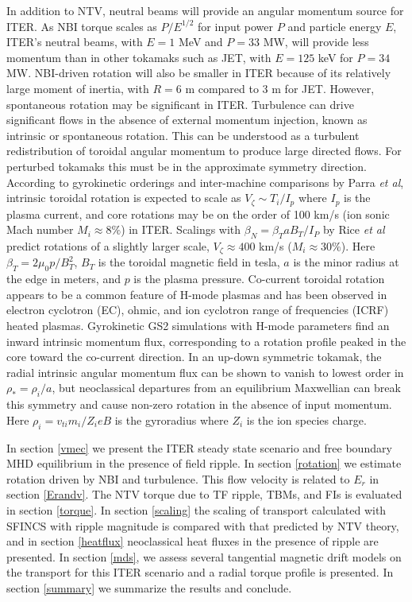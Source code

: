 \documentclass[aip, pop, preprint]{revtex4-1}
\numberwithin{figure}{section}
\numberwithin{equation}{section}
\begin{document}
In addition to NTV, neutral beams will provide an angular momentum source for ITER. As NBI torque scales as $P/E^{1/2}$ for input power $P$ and particle energy $E$, ITER's neutral beams, with $E = 1$ MeV and $P = 33$ MW, will provide less momentum than in other tokamaks such as JET, with $E = 125$ keV for $P = 34$ MW.\cite{Ciric2011} NBI-driven rotation will also be smaller in ITER because of its relatively large moment of inertia, with $R = 6$ m compared to 3 m for JET. However, spontaneous rotation may be significant in ITER. Turbulence can drive significant flows in the absence of external momentum injection, known as intrinsic or spontaneous rotation. This can be understood as a turbulent redistribution of toroidal angular momentum to produce large directed flows. For perturbed tokamaks this must be in the approximate symmetry direction. According to gyrokinetic orderings and inter-machine comparisons by Parra \textit{et al},\cite{Parra2012} intrinsic toroidal rotation is expected to scale as $V_{\zeta} \sim  T_i/I_p$ where $I_p$ is the plasma current, and core rotations may be on the order of 100 km/s (ion sonic Mach number $M_i \approx 8\%$) in ITER. Scalings with $\beta_N = \beta_T a B_T/I_P$ by Rice \textit{et al} \cite{Rice2007} predict rotations of a slightly larger scale, $V_{\zeta} \approx 400$ km/s ($M_i \approx 30\%$). Here $\beta_T =  2\mu_0 p/B_T^2$, $B_T$ is the toroidal magnetic field in tesla, $a$ is the minor radius at the edge in meters, and $p$ is the plasma pressure. Co-current toroidal rotation appears to be a common feature of H-mode plasmas and has been observed in electron cyclotron (EC),\cite{DeGrassie2007} ohmic,\cite{DeGrassie2007} and ion cyclotron range of frequencies (ICRF)\cite{Noterdaeme2003} heated plasmas. Gyrokinetic GS2 simulations with H-mode parameters find an inward intrinsic momentum flux, corresponding to a rotation profile peaked in the core toward the co-current direction.\cite{Lee2014} In an up-down symmetric tokamak, the radial intrinsic angular momentum flux can be shown to vanish to lowest order in $\rho_* = \rho_i/a$, but neoclassical departures from an equilibrium Maxwellian can break this symmetry and cause non-zero rotation in the absence of input momentum.\cite{Barnes2013} Here $\rho_i = v_{ti}m_i /{Z_ieB}$ is the gyroradius where $Z_i$ is the ion species charge.

In section \ref{vmec} we present the ITER steady state scenario and free boundary MHD equilibrium in the presence of field ripple. In section \ref{rotation} we estimate rotation driven by NBI and turbulence. This flow velocity is related to $E_r$ in section \ref{Erandv}. The NTV torque due to TF ripple, TBMs, and FIs is evaluated in section \ref{torque}. In section \ref{scaling} the scaling of transport calculated with SFINCS with ripple magnitude is compared with that predicted by NTV theory, and in section \ref{heatflux} neoclassical heat fluxes in the presence of ripple are presented. In section \ref{mds}, we assess several tangential magnetic drift models on the transport for this ITER scenario and a radial torque profile is presented. In section \ref{summary} we summarize the results and conclude.
\end{document}
